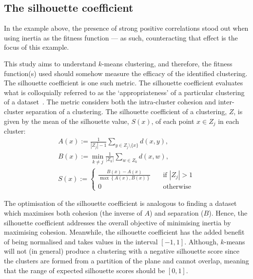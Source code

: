 \subsection{The silhouette coefficient}\label{subsec:silhouette}

In the example above, the presence of strong positive correlations stood out
when using inertia as the fitness function --- as such, counteracting that
effect is the focus of this example.

This study aims to understand \(k\)-means clustering, and therefore, the fitness
function(s) used should somehow measure the efficacy of the identified
clustering. The silhouette coefficient is one such metric. The silhouette
coefficient evaluates what is colloquially referred to as the `appropriateness'
of a particular clustering of a dataset~\cite{Rousseeuw1987}. The metric
considers both the intra-cluster cohesion and inter-cluster separation of a
clustering. The silhouette coefficient of a clustering, \(Z\), is given by the
mean of the silhouette value, \(S(x)\), of each point \(x \in Z_j\) in each
cluster:
\begin{equation}
    \begin{gathered}
        A(x) := \frac{1}{|Z_j| - 1} \sum_{y \in Z_j \setminus \{x\}} d(x, y),
        \\
        B(x) := \min_{k \neq j} \frac{1}{|Z_k|} \sum_{w \in Z_k} d(x, w),
        \\
        S(x) :=
            \begin{cases}
                \frac{B(x) - A(x)}{\max\left\{A(x), B(x)\right\}}
                &\quad \text{if } |Z_j| > 1\\
                0 &\quad \text{otherwise}
            \end{cases}
    \end{gathered}\label{eq:silhouette}
\end{equation}

The optimisation of the silhouette coefficient is analogous to finding a dataset
which maximises both cohesion (the inverse of \(A\)) and separation (\(B\)).
Hence, the silhouette coefficient addresses the overall objective of minimising
inertia by maximising cohesion. Meanwhile, the silhouette coefficient has the
added benefit of being normalised and takes values in the interval \(\left[-1,
1\right]\). Although, \(k\)-means will not (in general) produce a clustering
with a negative silhouette score since the clusters are formed from a partition
of the plane and cannot overlap, meaning that the range of expected silhouette
scores should be \(\left[0, 1\right]\).

